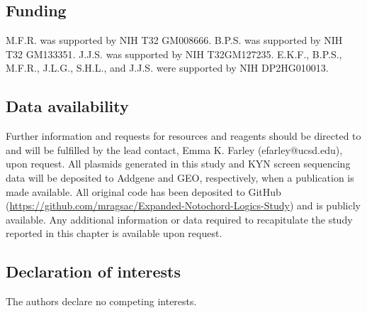 \subsection{Funding}
M.F.R. was supported by NIH T32 GM008666. B.P.S. was supported by NIH T32 GM133351. J.J.S. was supported by NIH T32GM127235. E.K.F., B.P.S., M.F.R., J.L.G., S.H.L., and J.J.S. were supported by NIH DP2HG010013.

\subsection{Data availability}
Further information and requests for resources and reagents should be directed to and will be fulfilled by the lead contact, Emma K. Farley (efarley@ucsd.edu), upon request. All plasmids generated in this study and KYN screen sequencing data will be deposited to Addgene and GEO, respectively, when a publication is made available. All original code has been deposited to GitHub (\href{https://github.com/mragsac/Expanded-Notochord-Logics-Study}{https://github.com/mragsac/Expanded-Notochord-Logics-Study}) and is publicly available. Any additional information or data required to recapitulate the study reported in this chapter is available upon request.

\subsection{Declaration of interests}
The authors declare no competing interests.
